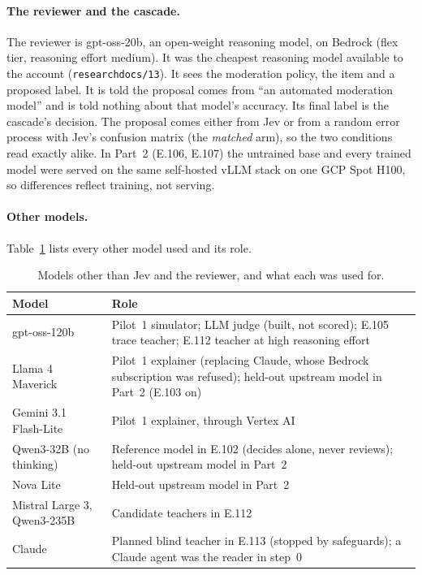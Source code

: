 \documentclass[11pt]{article}
\renewcommand{\_}{\origunderscore\allowbreak}
\begin{document}
\paragraph{The reviewer and the cascade.} The reviewer is gpt-oss-20b, an open-weight reasoning model, on Bedrock (flex tier, reasoning effort medium). It was the cheapest reasoning model available to the account (\texttt{research\_docs/13}). It sees the moderation policy, the item and a proposed label. It is told the proposal comes from ``an automated moderation model'' and is told nothing about that model's accuracy. Its final label is the cascade's decision. The proposal comes either from Jev or from a random error process with Jev's confusion matrix (the \emph{matched} arm), so the two conditions read exactly alike. In Part~2 (E.106, E.107) the untrained base and every trained model were served on the same self-hosted vLLM stack on one GCP Spot H100, so differences reflect training, not serving.

\paragraph{Other models.} Table~\ref{tab:intro-models} lists every other model used and its role.

\begin{table}[H]
\centering
\small
\begin{tabularx}{\textwidth}{@{}p{3.6cm}X@{}}
\toprule
Model & Role \\
\midrule
gpt-oss-120b & Pilot~1 simulator; LLM judge (built, not scored); E.105 trace teacher; E.112 teacher at high reasoning effort \\
Llama 4 Maverick & Pilot~1 explainer (replacing Claude, whose Bedrock subscription was refused); held-out upstream model in Part~2 (E.103 on) \\
Gemini 3.1 Flash-Lite & Pilot~1 explainer, through Vertex AI \\
Qwen3-32B (no thinking) & Reference model in E.102 (decides alone, never reviews); held-out upstream model in Part~2 \\
Nova Lite & Held-out upstream model in Part~2 \\
Mistral Large 3, Qwen3-235B & Candidate teachers in E.112 \\
Claude & Planned blind teacher in E.113 (stopped by safeguards); a Claude agent was the reader in step~0 \\
\bottomrule
\end{tabularx}
\caption{Models other than Jev and the reviewer, and what each was used for.}
\label{tab:intro-models}
\end{table}
\end{document}
